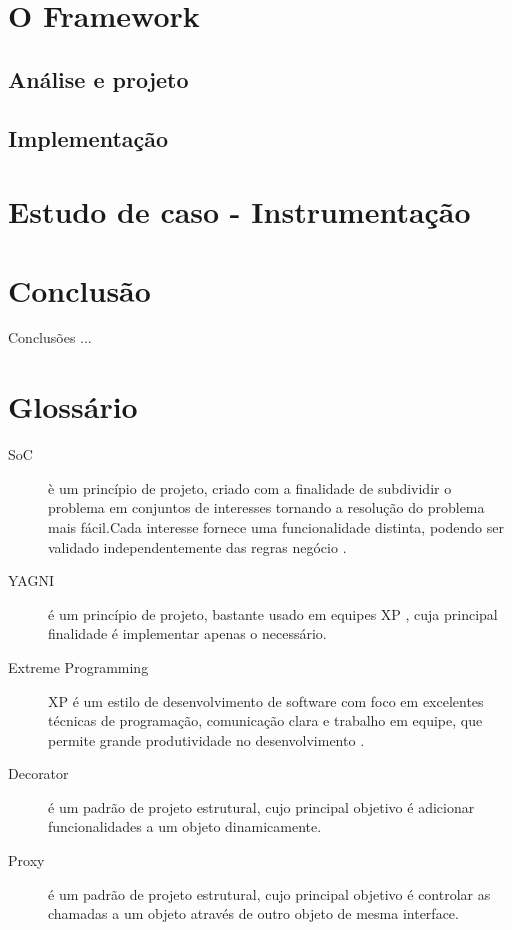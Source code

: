 \documentclass[tc,openright]{iiufrgs}
\begin{document}
\chapter{O Framework}

\section{Análise e projeto}

\section{Implementação}

\chapter{Estudo de caso - Instrumentação}

\chapter{Conclusão}

Conclusões ...



\chapter*{Glossário}

\begin{description}
	\item[SoC] è um princípio de projeto, criado com a finalidade de subdividir o problema em conjuntos de interesses tornando a resolução do problema mais fácil.Cada interesse fornece uma funcionalidade distinta, podendo ser validado independentemente das regras negócio \cite{pressman2010engineering}.
	\item [YAGNI] é um princípio de projeto, bastante usado em equipes XP , cuja principal finalidade é implementar apenas o necessário.
	\item[Extreme Programming] XP é um estilo de desenvolvimento de software com foco em excelentes técnicas de programação, comunicação clara e trabalho em equipe, que permite grande produtividade no desenvolvimento \cite{beck2004extreme}.
\item [Decorator] é um padrão de projeto estrutural, cujo principal objetivo é adicionar funcionalidades a um objeto dinamicamente.
\item [Proxy] é um padrão de projeto estrutural, cujo principal objetivo é controlar as chamadas a um objeto através de outro objeto de mesma interface.
\end{description}

\appendix
\end{document}
